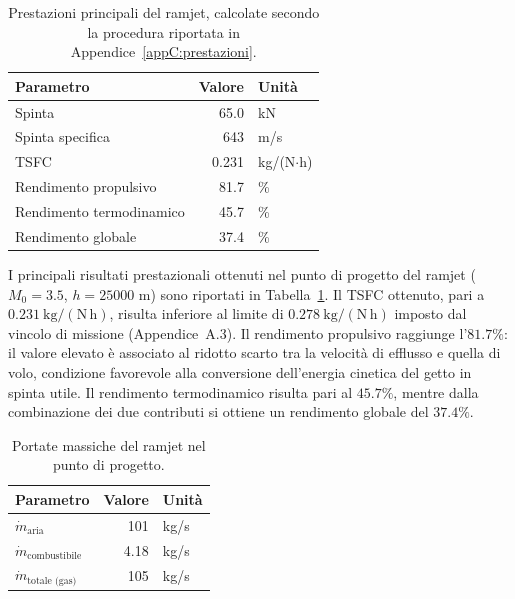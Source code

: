 \begin{table}[H]
\centering
\renewcommand{\arraystretch}{1}
\fontsize{11pt}{11pt}\selectfont
\caption{Prestazioni principali del ramjet, calcolate secondo la procedura riportata in Appendice~\ref{appC:prestazioni}.}
\label{tab:prestazioni_ramjet}
\begin{tabular}{lrl}
\toprule
\textbf{Parametro} & \textbf{Valore} & \textbf{Unità} \\
\midrule
Spinta                    & 65.0    & kN \\
Spinta specifica         & 643 & m/s \\
TSFC                      & 0.231 & kg/(N$\cdot$h) \\
Rendimento propulsivo     & 81.7  & \% \\
Rendimento termodinamico  & 45.7  & \% \\
Rendimento globale        & 37.4  & \% \\
\bottomrule
\end{tabular}
\end{table}
I principali risultati prestazionali ottenuti nel punto di progetto del ramjet ($M_0=3.5$, $h=25000$ m) sono riportati in Tabella~\ref{tab:prestazioni_ramjet}. Il TSFC ottenuto, pari a $0.231\ \mathrm{kg/(N\,h)}$, risulta inferiore
al limite di $0.278\ \mathrm{kg/(N\,h)}$ imposto dal vincolo di missione
(Appendice~A.3). Il rendimento propulsivo raggiunge l'$81.7\%$: il valore
elevato è associato al ridotto scarto tra la velocità di efflusso e quella
di volo, condizione favorevole alla conversione dell'energia cinetica del
getto in spinta utile. Il rendimento termodinamico risulta pari al
$45.7\%$, mentre dalla combinazione dei due contributi si ottiene un
rendimento globale del $37.4\%$.

\begin{table}[H]
\centering
\renewcommand{\arraystretch}{1}
\fontsize{11pt}{11pt}\selectfont
\caption{Portate massiche del ramjet nel punto di progetto.}
\label{tab:mass_ramjet}
\small
\begin{tabular}{lrl}
\toprule
\textbf{Parametro} & \textbf{Valore} & \textbf{Unità} \\
\midrule
$\dot{m}_{\text{aria}}$         & 101 & kg/s \\
$\dot{m}_{\text{combustibile}}$ & 4.18   & kg/s \\
$\dot{m}_{\text{totale (gas)}}$ & 105 & kg/s \\
\bottomrule
\end{tabular}
\end{table}

